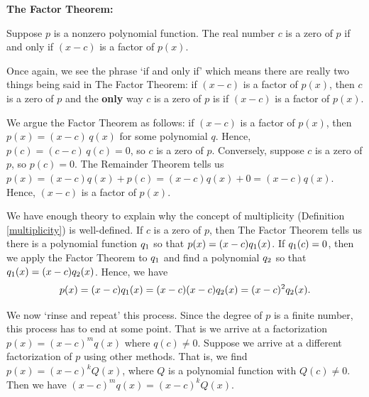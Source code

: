 \documentclass{ximera}
\begin{document}
\medskip

\colorbox{ResultColor}{\bbm

\begin{thm} \label{factorthm}\textbf{The Factor Theorem:}  

Suppose $p$ is a nonzero polynomial function.  The real number $c$ is a zero of $p$ if and only if $(x-c)$ is a factor of $p(x)$.  

\end{thm}
\ebm}

\medskip

Once again, we see the phrase `if and only if' which means there are really two things being said in  The Factor Theorem:  if $(x-c)$ is a factor of $p(x)$, then $c$ is a zero of $p$ and the \textbf{only} way $c$ is a zero  of $p$ is if $(x-c)$ is a factor of $p(x)$.  

\medskip

We argue the Factor Theorem as follows:   if $(x-c)$ is a factor of $p(x)$, then $p(x) = (x-c) \, q(x)$ for some polynomial $q$.  Hence, $p(c) = (c-c) \, q(c) = 0$, so $c$ is a zero of $p$.  Conversely, suppose $c$ is a zero of $p$, so $p(c) = 0$.   The Remainder Theorem tells us $p(x) = (x-c)q(x) + p(c) = (x-c)q(x) + 0 = (x-c)q(x)$.   Hence, $(x-c)$ is a factor of $p(x)$. 

\medskip

We have enough theory to explain why the concept of multiplicity (Definition \ref{multiplicity}) is well-defined. If $c$ is a zero of $p$, then The Factor Theorem tells us there is a polynomial function $q_{\text{\scriptsize $1$}}$ so that $p(x) = (x-c)q_{\text{\scriptsize $1$}}(x)$.  If $q_{\text{\scriptsize $1$}}(c) = 0$, then we apply the Factor Theorem to $q_{\text{\scriptsize $1$}}$ and find a  polynomial $q_{\text{\scriptsize $2$}}$ so that $q_{\text{\scriptsize $1$}}(x)  = (x-c) q_{\text{\scriptsize $2$}}(x)$.    Hence, we have  \[p(x) = (x-c) q_{\text{\scriptsize $1$}}(x) = (x-c) (x-c) q_{\text{\scriptsize $2$}}(x) = (x-c)^2 q_{\text{\scriptsize $2$}}(x).\]

\medskip

We now `rinse and repeat' this process.  Since the degree of $p$ is a finite number, this process has to end at some point.  That is we arrive at a factorization  $p(x) = (x-c)^m q(x)$ where $q(c) \neq 0$.  Suppose we arrive at a different factorization of $p$ using other methods.  That is, we find $p(x) = (x-c)^k Q(x)$, where $Q$ is a polynomial function with $Q(c) \neq 0$.   Then we have $(x-c)^m q(x) = (x-c)^k Q(x)$.    
\end{document}
